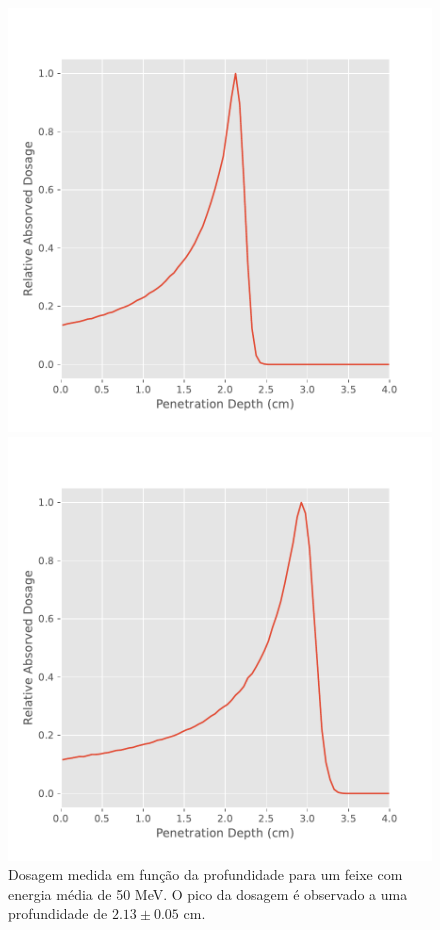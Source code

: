 \documentclass[a4paper, 12pt]{article} %
\begin{document}
	\begin{figure}[H]
		\begin{minipage}[r]{.49\linewidth}
			\centering
			\includegraphics[width=\linewidth]{bragg_peak_50mev.pdf}
			\caption{Dosagem medida em função da profundidade para um feixe com energia média de 50 MeV. O pico da dosagem é observado a uma profundidade de $2.13 \pm 0.05$ cm.}
			\label{fig:bragg_peak50}
		\end{minipage}
		\hspace{.01\linewidth}
		\begin{minipage}[r]{.49\linewidth}
			\centering
			\includegraphics[width=\linewidth]{bragg_peak_60mev.pdf}

\end{minipage}
\end{figure}
\end{document}
